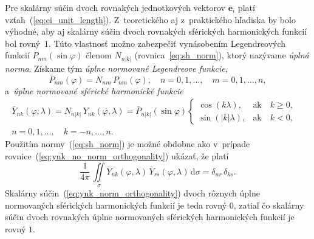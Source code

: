\documentclass[a4paper,12pt]{book}
\newcommand{\diff}{\mathrm d}
\let\vec\mathbf
\begin{document}
Pre skalárny súčin dvoch rovnakých jednotkových vektorov $\vec e_i$ platí 
vzťah~(\ref{eq:ei_unit_length}).  Z~teoretického aj z~praktického hľadiska by 
bolo výhodné, aby aj skalárny súčin dvoch rovnakých sférických harmonických 
funkcií bol rovný~$1$.  Túto vlastnosť možno zabezpečiť vynásobením 
Legendreových funkcií $P_{nm}(\sin\varphi)$ členom $N_{n|k|}$ 
(rovnica~\ref{eq:sh_norm}), ktorý nazývame \emph{úplná norma}.  Získame tým 
\emph{úplne normované Legendreove funkcie},
%
\begin{equation}
\bar{P}_{nm}(\varphi) = N_{nm} \, P_{nm}(\varphi){,} \quad  n = 0, 1, \dots,
\quad m = 0, 1, \dots, n{,}
\end{equation}
%
a~\emph{úplne normované sférické harmonické funkcie}
%
\begin{equation}
\label{eq:ynk_norm}
\begin{split}
\bar{Y}_{nk}(\varphi, \lambda) = N_{n|k|} \, Y_{nk}(\varphi, \lambda)
= \bar{P}_{n|k|}(\sin\varphi)
%
\begin{cases}
\cos(k\lambda){,}    &\text{ak} \quad k \geq 0{,}\\
\sin(|k|\lambda){,}  &\text{ak} \quad k < 0{,}
\end{cases}
&
%
\\
n = 0, 1, \dots, \quad k = -n, \dots, n{.}&
\end{split}
\end{equation}
%
Použitím normy~(\ref{eq:sh_norm}) je možné obdobne ako v~prípade
rovnice~(\ref{eq:ynk_no_norm_orthogonality}) ukázať, že platí
%
\begin{equation}
\label{eq:ynk_norm_orthogonality}
\frac{1}{4\pi} \, \iint\limits_{\sigma} \bar{Y}_{nk}(\varphi, \lambda) \,
\bar{Y}_{rs}(\varphi, \lambda) \, \diff \sigma = \delta_{nr} \, \delta_{ks}{.}
\end{equation}
%
Skalárny súčin~(\ref{eq:ynk_norm_orthogonality}) dvoch rôznych úplne
normovaných sférických harmonických funkcií je teda rovný 0, zatiaľ čo skalárny
súčin dvoch rovnakých úplne normovaných sférických harmonických funkcií je
rovný $1$.
\end{document}
